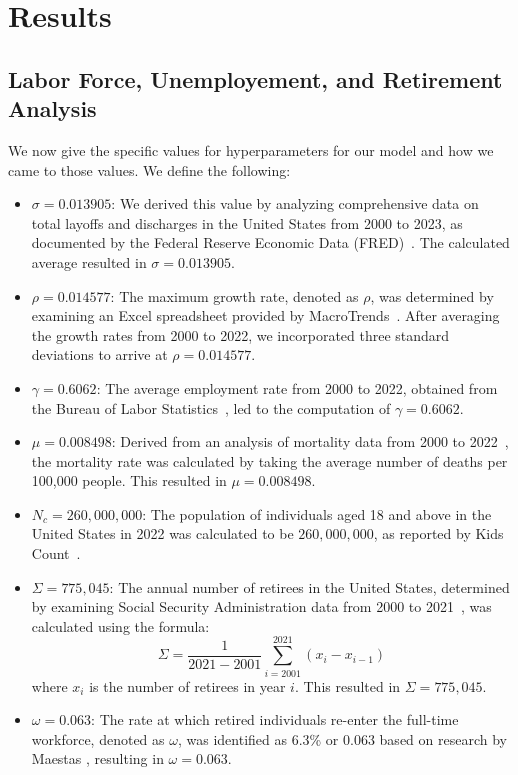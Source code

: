 \documentclass[11pt]{amsart}
\begin{document}
\section{Results}

\subsection{Labor Force, Unemployement, and Retirement Analysis}

We now give the specific values for hyperparameters for our model and how we came to those values. We define the following:

\begin{itemize}
    \item $\sigma = 0.013905$: We derived this value by analyzing comprehensive data on total layoffs and discharges in the United States from 2000 to 2023, as documented by the Federal Reserve Economic Data (FRED)~\cite{FRED}. The calculated average resulted in $\sigma = 0.013905$.
    \item $\rho = 0.014577$: The maximum growth rate, denoted as $\rho$, was determined by examining an Excel spreadsheet provided by MacroTrends~\cite{MacroTrends}. After averaging the growth rates from 2000 to 2022, we incorporated three standard deviations to arrive at $\rho = 0.014577$.
    \item $\gamma = 0.6062$: The average employment rate from 2000 to 2022, obtained from the Bureau of Labor Statistics~\cite{BLS}, led to the computation of $\gamma = 0.6062$.
    \item $\mu = 0.008498$: Derived from an analysis of mortality data from 2000 to 2022~\cite{usafacts}, the mortality rate was calculated by taking the average number of deaths per 100,000 people. This resulted in $\mu = 0.008498$.
    \item $N_c = 260,000,000$: The population of individuals aged 18 and above in the United States in 2022 was calculated to be $260,000,000$, as reported by Kids Count~\cite{kidscount}.
    \item $\Sigma = 775,045$: The annual number of retirees in the United States, determined by examining Social Security Administration data from 2000 to 2021~\cite{ssa}, was calculated using the formula:
    \[
        \Sigma = \frac{1}{2021 - 2001}\sum_{i=2001}^{2021}(x_i - x_{i-1})
    \]
    where $x_i$ is the number of retirees in year $i$. This resulted in $\Sigma = 775,045$.
    \item $\omega = 0.063$: The rate at which retired individuals re-enter the full-time workforce, denoted as $\omega$, was identified as 6.3\% or $0.063$ based on research by Maestas \cite{maestas}, resulting in $\omega = 0.063$.
\end{itemize}
\end{document}
